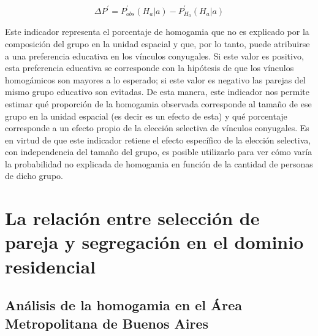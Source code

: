\documentclass[
  spanish,
  a4paper,%
  chapterprefix=true,%
  DIV=calc,%
  twoside]{scrbook}%
\begin{document}
\[
\Delta P^{\prime} = P_{obs}^{\prime}(H_a|a) - P_{H_0}^{\prime}(H_a|a)
\]

Este indicador representa el porcentaje de homogamia que no es explicado
por la composición del grupo en la unidad espacial y que, por lo tanto,
puede atribuirse a una preferencia educativa en los vínculos conyugales.
Si este valor es positivo, esta preferencia educativa se corresponde con
la hipótesis de que los vínculos homogámicos son mayores a lo esperado;
si este valor es negativo las parejas del mismo grupo educativo son
evitadas. De esta manera, este indicador nos permite estimar qué
proporción de la homogamia observada corresponde al tamaño de ese grupo
en la unidad espacial (es decir es un efecto de esta) y qué porcentaje
corresponde a un efecto propio de la elección selectiva de vínculos
conyugales. Es en virtud de que este indicador retiene el efecto
específico de la elección selectiva, con independencia del tamaño del
grupo, es posible utilizarlo para ver cómo varía la probabilidad no
explicada de homogamia en función de la cantidad de personas de dicho
grupo.

\section{La relación entre selección de pareja y segregación en el dominio residencial}\label{homogamy-analysis}

\subsection*{Análisis de la homogamia en el Área Metropolitana de Buenos Aires}\label{anuxe1lisis-de-la-homogamia-en-el-uxe1rea-metropolitana-de-buenos-aires}
\end{document}
